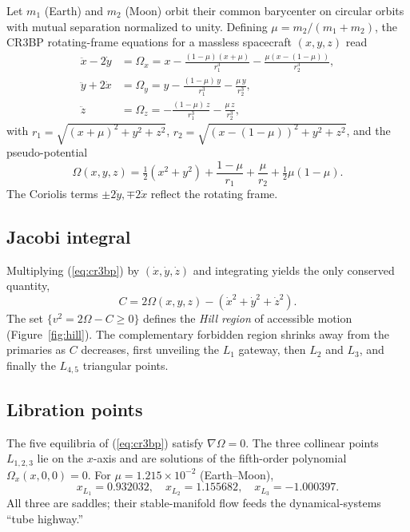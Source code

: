\documentclass[11pt,a4paper]{article}
\begin{document}
Let $m_1$ (Earth) and $m_2$ (Moon) orbit their common barycenter on circular orbits with mutual separation normalized to unity. Defining $\mu = m_2/(m_1+m_2)$, the CR3BP rotating-frame equations for a massless spacecraft $(x,y,z)$ read
\begin{equation}
\label{eq:cr3bp}
\boxed{\;
\begin{aligned}
\ddot{x} - 2\dot{y} &= \Omega_x = x - \frac{(1-\mu)(x+\mu)}{r_1^3} - \frac{\mu(x-(1-\mu))}{r_2^3}, \\
\ddot{y} + 2\dot{x} &= \Omega_y = y - \frac{(1-\mu)\,y}{r_1^3} - \frac{\mu\,y}{r_2^3}, \\
\ddot{z}            &= \Omega_z = -\frac{(1-\mu)\,z}{r_1^3} - \frac{\mu\,z}{r_2^3},
\end{aligned}
\;}
\end{equation}
with $r_1 = \sqrt{(x+\mu)^2 + y^2 + z^2}$, $r_2 = \sqrt{(x-(1-\mu))^2 + y^2 + z^2}$, and the pseudo-potential
\begin{equation}
\Omega(x,y,z) = \tfrac{1}{2}(x^2 + y^2) + \frac{1-\mu}{r_1} + \frac{\mu}{r_2} + \tfrac{1}{2}\mu(1-\mu).
\end{equation}
The Coriolis terms $\pm 2\dot{y}, \mp 2\dot{x}$ reflect the rotating frame.

\subsection{Jacobi integral}
Multiplying (\ref{eq:cr3bp}) by $(\dot x, \dot y, \dot z)$ and integrating yields the only conserved quantity,
\begin{equation}
\label{eq:jacobi}
C = 2\Omega(x,y,z) - (\dot x^2 + \dot y^2 + \dot z^2).
\end{equation}
The set $\{v^2 = 2\Omega - C \ge 0\}$ defines the \emph{Hill region} of accessible motion (Figure~\ref{fig:hill}). The complementary forbidden region shrinks away from the primaries as $C$ decreases, first unveiling the $L_1$ gateway, then $L_2$ and $L_3$, and finally the $L_{4,5}$ triangular points.

\subsection{Libration points}
The five equilibria of (\ref{eq:cr3bp}) satisfy $\nabla \Omega = 0$. The three collinear points $L_{1,2,3}$ lie on the $x$-axis and are solutions of the fifth-order polynomial $\Omega_x(x,0,0) = 0$. For $\mu = 1.215\times 10^{-2}$ (Earth--Moon),
\begin{equation}
x_{L_1} = 0.932032, \quad x_{L_2} = 1.155682, \quad x_{L_3} = -1.000397.
\end{equation}
All three are saddles; their stable-manifold flow feeds the dynamical-systems ``tube highway.''
\end{document}
